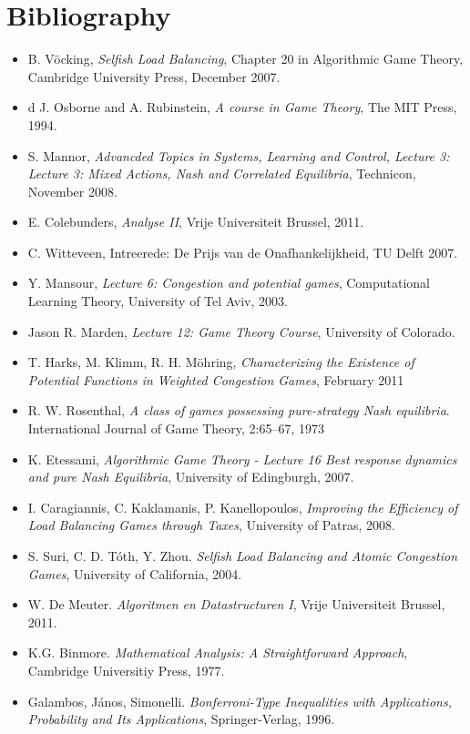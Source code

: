\documentclass{beamer}
\begin{document}
\section*{Bibliography}
\begin{frame}
\begin{itemize}
 \item B. V\"{o}cking, \emph{Selfish Load Balancing}, Chapter 20 in Algorithmic Game Theory, Cambridge University Press, December 2007.
\item d J. Osborne and A. Rubinstein, \emph{A course in Game Theory},  The MIT Press, 1994.
\item S. Mannor, \emph{Advancded Topics in Systems, Learning and Control, Lecture 3: Lecture 3: Mixed Actions, Nash and Correlated Equilibria}, Technicon, November 2008.
\item E. Colebunders, \emph{Analyse II}, Vrije Universiteit Brussel, 2011.
\item C. Witteveen, Intreerede: De Prijs van de Onafhankelijkheid, TU Delft 2007.
\item Y. Mansour, \emph{Lecture 6: Congestion and potential games}, Computational Learning Theory, University of Tel Aviv, 2003.
\item Jason R. Marden, \emph{Lecture 12: Game Theory Course}, University of Colorado.
\item T. Harks, M. Klimm, R. H. M\"{o}hring, \emph{Characterizing the Existence of Potential Functions in Weighted Congestion Games}, February 2011
\end{itemize}
\end{frame}

\begin{frame}
\begin{itemize}
\item R. W. Rosenthal, \emph{ A class of games possessing pure-strategy Nash equilibria}. International Journal of Game Theory, 2:65–67, 1973
\item K. Etessami, \emph{Algorithmic Game Theory - Lecture 16 Best response dynamics and pure Nash Equilibria}, University of Edingburgh, 2007.

\item I. Caragiannis, C. Kaklamanis, P. Kanellopoulos, \emph{Improving the Efficiency of Load Balancing Games through Taxes}, University of Patras, 2008.

\item S. Suri, C. D. T\'{o}th, Y. Zhou. \emph{Selfish Load Balancing and Atomic Congestion Games}, University of California, 2004.
\item W. De Meuter. \emph{Algoritmen en Datastructuren I}, Vrije Universiteit Brussel, 2011.
\item K.G. Binmore. \emph{Mathematical Analysis: A Straightforward Approach}, Cambridge Universitiy Press, 1977.
\item Galambos, J\'{a}nos, Simonelli. \emph{Bonferroni-Type Inequalities with Applications, Probability and Its Applications}, Springer-Verlag, 1996.
\end{itemize}
\end{frame}
\end{document}
